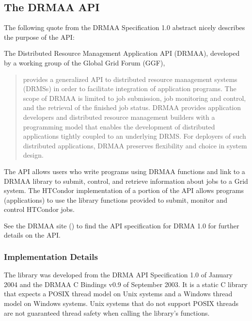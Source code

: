 \subsection{\label{API-DRMAA} The DRMAA API}

The following quote from the DRMAA Specification 1.0 abstract
nicely describes the purpose of the API:

The Distributed Resource Management Application API (DRMAA),
developed by a working group of the Global Grid Forum (GGF),
\begin{quote}
provides a generalized API to distributed resource management systems
(DRMSs) in order to facilitate integration of application programs.
The scope of DRMAA is limited to job submission,
job monitoring and control,
and the retrieval of the finished job status.
DRMAA provides application developers and
distributed resource management builders
with a programming model that enables
the development of distributed applications
tightly coupled to an underlying DRMS.
For deployers of such distributed applications,
DRMAA preserves flexibility and choice in system design.
\end{quote}

The API allows users who write programs using DRMAA functions
and link to a DRMAA library to submit,
control, and retrieve information about jobs to a Grid system.
The HTCondor implementation of a portion of the API
allows programs (applications) to use the library
functions provided to submit, monitor and control
HTCondor jobs.

See the DRMAA site 
() to find the
API specification for DRMA 1.0 for further details on the API.

\subsubsection{\label{DRMAA-Implementation} Implementation Details}


The library was developed from the DRMA API Specification 1.0 of January 2004
and the DRMAA C Bindings v0.9 of September 2003.
It is a static C library that expects a POSIX thread model
on Unix systems and a Windows thread model on Windows systems.
Unix systems that do not support POSIX threads
are not guaranteed thread safety when calling the library's functions.

